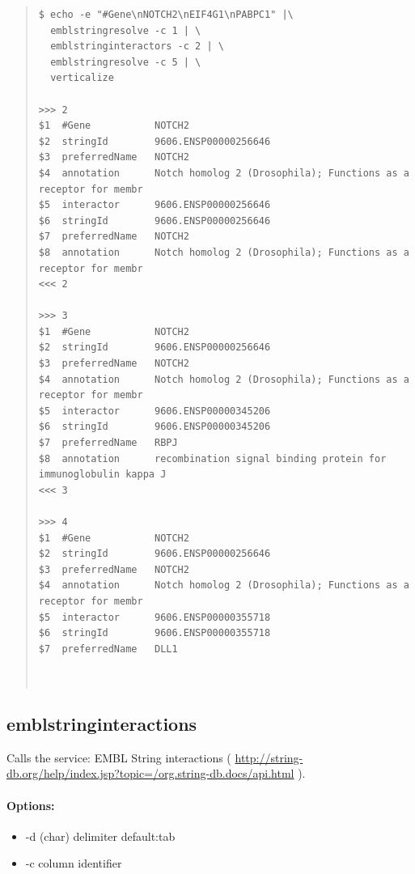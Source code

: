 \documentclass[12pt]{article}
\begin{document}
\begin{quote}
\begin{verbatim}
$ echo -e "#Gene\nNOTCH2\nEIF4G1\nPABPC1" |\
  emblstringresolve -c 1 | \
  emblstringinteractors -c 2 | \
  emblstringresolve -c 5 | \
  verticalize
  
>>>	2
$1	#Gene        	NOTCH2
$2	stringId     	9606.ENSP00000256646
$3	preferredName	NOTCH2
$4	annotation   	Notch homolog 2 (Drosophila); Functions as a receptor for membr
$5	interactor   	9606.ENSP00000256646
$6	stringId     	9606.ENSP00000256646
$7	preferredName	NOTCH2
$8	annotation   	Notch homolog 2 (Drosophila); Functions as a receptor for membr
<<<	2

>>>	3
$1	#Gene        	NOTCH2
$2	stringId     	9606.ENSP00000256646
$3	preferredName	NOTCH2
$4	annotation   	Notch homolog 2 (Drosophila); Functions as a receptor for membr
$5	interactor   	9606.ENSP00000345206
$6	stringId     	9606.ENSP00000345206
$7	preferredName	RBPJ
$8	annotation   	recombination signal binding protein for immunoglobulin kappa J
<<<	3

>>>	4
$1	#Gene        	NOTCH2
$2	stringId     	9606.ENSP00000256646
$3	preferredName	NOTCH2
$4	annotation   	Notch homolog 2 (Drosophila); Functions as a receptor for membr
$5	interactor   	9606.ENSP00000355718
$6	stringId     	9606.ENSP00000355718
$7	preferredName	DLL1
  
  
\end{verbatim}
\end{quote}

\subsection{emblstringinteractions}
Calls the service: EMBL String interactions ( \url{http://string-db.org/help/index.jsp?topic=/org.string-db.docs/api.html} ).
\paragraph{Options:}
\begin{itemize}
\item-d (char) delimiter default:tab
\item-c column identifier
\end{itemize}
\end{document}
